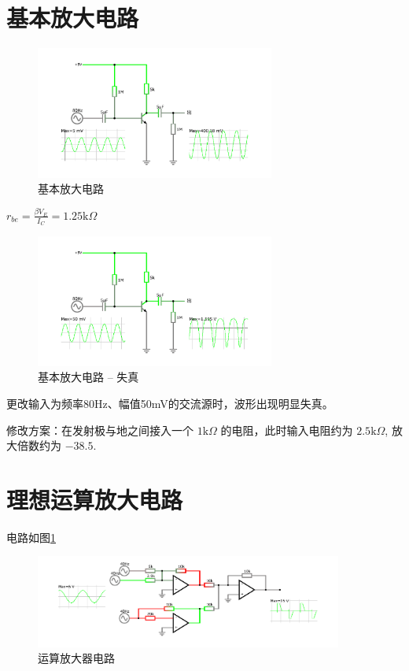 \documentclass{article}
\newcommand{\np}{\noindent\par}
\begin{document}
\section{基本放大电路}

\begin{figure}[htbp]
    \centering
    \includegraphics[width=0.7\textwidth]{基本放大电路.pdf}
    \caption{基本放大电路}
\end{figure}

$r_{be} = \frac{\beta V_E}{I_C} = 1.25 \mathrm{k}\Omega$ \np

\begin{figure}[htbp]
    \centering
    \includegraphics[width=0.7\textwidth]{基本放大电路_失真.pdf}
    \caption{基本放大电路 -- 失真}
\end{figure}

更改输入为频率80Hz、幅值50mV的交流源时，波形出现明显失真。 \np
修改方案：在发射极与地之间接入一个 $1\mathrm{k}\Omega$ 的电阻，此时输入电阻约为 $2.5 \mathrm{k}\Omega$, 放大倍数约为 $-38.5$.

\section{理想运算放大电路}

电路如图\ref{fig:yunsuanfangdaqi}
\begin{figure}
    \centering
    \includegraphics[width=0.9\textwidth]{运算放大器.pdf}
    \caption{运算放大器电路}
    \label{fig:yunsuanfangdaqi}
\end{figure}
\end{document}
